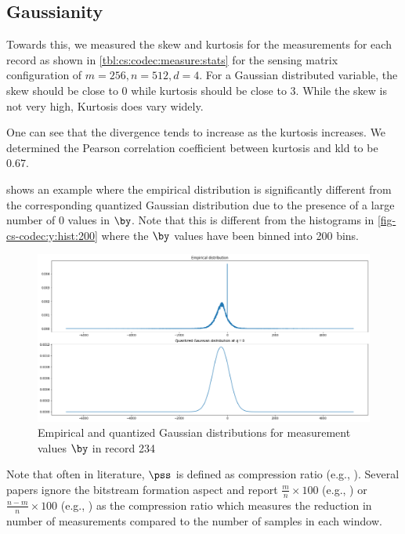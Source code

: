 \subsection{Gaussianity}

Towards this, we measured the
skew and kurtosis for the measurements for each record
as shown in \cref{tbl:cs:codec:measure:stats}
for the sensing matrix configuration of $m=256,n=512,d=4$.
For a Gaussian distributed variable,
the skew should be close to $0$ while kurtosis should be close to $3$.
While the skew is not very high, Kurtosis does vary widely.

One can see that the divergence tends to increase as the
kurtosis increases. We determined the Pearson correlation
coefficient between kurtosis and kld to be $0.67$.


 shows an example
where the empirical distribution is significantly different
from the corresponding quantized Gaussian distribution
due to the presence of a large
number of $0$ values in $\by$. Note that this is different
from the histograms in \cref{fig-cs-codec:y:hist:200} where
the $\by$ values have been binned into 200 bins.

\begin{figure}[htb]
    \centering %
  \centering 
  \includegraphics[width=0.95\linewidth]
  {images/rec_234_empirical_vs_quantized_gaussian.png}
\caption{Empirical and quantized Gaussian distributions for measurement values
$\by$ in record 234}
\label{fig-cs-codec:y:234:empirical:quantized}
\end{figure}

%
%
Note that often in literature, $\pss$ is defined as compression ratio
(e.g., \cite{mamaghanian2011compressed}).
Several papers ignore the bitstream formation aspect
and report $\frac{m}{n} \times 100$
(e.g., \cite{zhang2016comparison})
or $\frac{n - m}{n} \times 100$ (e.g., \cite{zhang2021csnet})
as the compression ratio
which measures the reduction in number of measurements
compared to the number of samples in each window.

